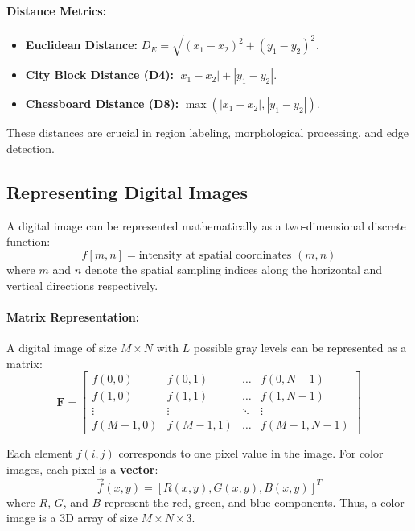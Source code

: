 \documentclass[12pt,a4paper]{AnantDocumentation}
\begin{document}
\paragraph{Distance Metrics:}
\begin{itemize}
\item \textbf{Euclidean Distance:} $D_E = \sqrt{(x_1-x_2)^2 + (y_1-y_2)^2}$.
\item \textbf{City Block Distance (D4):} $|x_1-x_2| + |y_1-y_2|$.
\item \textbf{Chessboard Distance (D8):} $\max(|x_1-x_2|, |y_1-y_2|)$.
\end{itemize}

These distances are crucial in region labeling, morphological processing, and edge detection.

\subsection{Representing Digital Images}

A digital image can be represented mathematically as a two-dimensional discrete function:
\begin{equation}
f[m, n] = \text{intensity at spatial coordinates } (m, n)
\end{equation}
where $m$ and $n$ denote the spatial sampling indices along the horizontal and vertical directions respectively.

\paragraph{Matrix Representation:}
A digital image of size $M \times N$ with $L$ possible gray levels can be represented as a matrix:
\begin{equation}
\mathbf{F} = 
\begin{bmatrix}
f(0,0) & f(0,1) & \dots & f(0,N-1) \\
f(1,0) & f(1,1) & \dots & f(1,N-1) \\
\vdots & \vdots & \ddots & \vdots \\
f(M-1,0) & f(M-1,1) & \dots & f(M-1,N-1)
\end{bmatrix}
\end{equation}

Each element $f(i,j)$ corresponds to one pixel value in the image. 
For color images, each pixel is a \textbf{vector}:
\begin{equation}
\vec{f}(x, y) = [R(x, y), G(x, y), B(x, y)]^T
\end{equation}
where $R$, $G$, and $B$ represent the red, green, and blue components. 
Thus, a color image is a 3D array of size $M \times N \times 3$.
\end{document}

